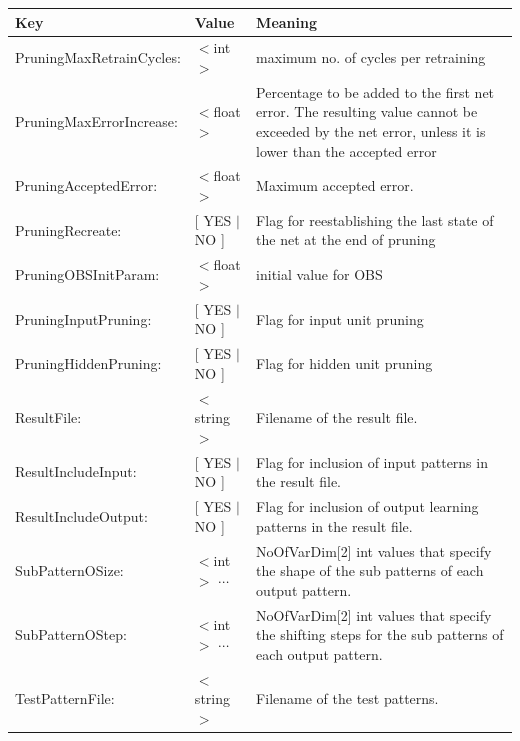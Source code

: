 {\newpage
\clearpage
\samepage \begin{tabular}{|llp{70mm}|}
\hline
Key             &Value          &Meaning\\  \hline \hline

PruningMaxRetrainCycles: & $<$int$>$ & maximum no. of cycles per
retraining \\ 

PruningMaxErrorIncrease: & $<$float$>$ & Percentage to be added to the
first net error. The resulting value cannot be exceeded by the net
error, unless it is lower than the accepted error \\ 

PruningAcceptedError: & $<$float$>$ & Maximum accepted error.\\ 

PruningRecreate: & [ YES $|$ NO ] & Flag for reestablishing the last
state of the net at the end of pruning \\ 

PruningOBSInitParam: & $<$float$>$ & initial value for OBS \\ 

PruningInputPruning: & [ YES $|$ NO ] & Flag for input unit pruning \\ 

PruningHiddenPruning: & [ YES $|$ NO ] & Flag for hidden unit pruning \\ 

ResultFile:     &$<$string$>$           &Filename of the result file.\\ 

ResultIncludeInput:     &[ YES $|$ NO ]         &Flag for inclusion of input
patterns in the result file.\\ 

ResultIncludeOutput:    &[ YES $|$ NO ]         &Flag for inclusion of output
learning patterns in the result file.\\  

SubPatternOSize: &$<$int$>$ $\cdots$ &NoOfVarDim[2] int values that specify
the shape of the sub patterns of each output pattern.\\ 

SubPatternOStep: &$<$int$>$ $\cdots$ &NoOfVarDim[2] int values that
specify the shifting steps for the sub patterns of each output pattern.\\ 

TestPatternFile: &$<$string$>$          &Filename of the test patterns.\\ 


\end{tabular}}
